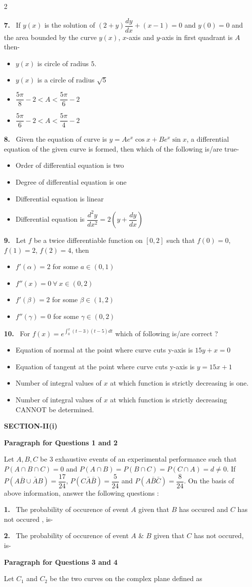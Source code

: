 \documentclass[10pt]{extarticle}
\newcommand{\sect}[1]{\par\smallskip\noindent\textbf{#1}\par}
\newcommand{\qn}[1]{\par\smallskip\noindent\textbf{#1.}~}
\newcommand{\paraq}[2]{\par\smallskip\noindent\textbf{Paragraph for Questions #1 and #2}\par}
\newenvironment{qoptions}{\begin{itemize}[leftmargin=1.8em,itemsep=1pt,topsep=2pt,label={}]}{\end{itemize}}
\newcommand{\opt}[2]{\item[(#1)] #2}
\begin{document}
\begin{multicols}{2}
\begin{qoptions}
\end{qoptions}
\qn{7} If $y(x)$ is the solution of $(2+y)\dfrac{dy}{dx}+(x-1)=0$ and $y(0)=0$ and the area bounded by the curve $y(x)$, $x$-axis and $y$-axis in first quadrant is $A$ then-
\begin{qoptions}
\opt{A}{$y(x)$ is circle of radius $5$.}
\opt{B}{$y(x)$ is a circle of radius $\sqrt5$}
\opt{C}{$\dfrac{5\pi}8-2<A<\dfrac{5\pi}{6}-2$}
\opt{D}{$\dfrac{5\pi}6-2<A<\dfrac{5\pi}{4}-2$}
\end{qoptions}
\qn{8} Given the equation of curve is $y=Ae^x\cos x+Be^x\sin x$, a differential equation of the given curve is formed, then which of the following is/are true-
\begin{qoptions}
\opt{A}{Order of differential equation is two}
\opt{B}{Degree of differential equation is one}
\opt{C}{Differential equation is linear}
\opt{D}{Differential equation is $\dfrac{d^2y}{dx^2}=2\left(y+\dfrac{dy}{dx}\right)$}
\end{qoptions}
\qn{9} Let $f$ be a twice differentiable function on $[0,2]$ such that $f(0)=0$, $f(1)=2$, $f(2)=4$, then
\begin{qoptions}
\opt{A}{$f'(\alpha)=2$ for some $a\in(0,1)$}
\opt{B}{$f''(x)=0\ \forall\ x\in(0,2)$}
\opt{C}{$f'(\beta)=2$ for some $\beta\in(1,2)$}
\opt{D}{$f''(\gamma)=0$ for some $\gamma\in(0,2)$}
\end{qoptions}
\qn{10} For $f(x)=e^{\int_0^x(t-3)(t-5)dt}$ which of following is/are correct ?
\begin{qoptions}
\opt{A}{Equation of normal at the point where curve cuts y-axis is $15y+x=0$}
\opt{B}{Equation of tangent at the point where curve cuts y-axis is $y=15x+1$}
\opt{C}{Number of integral values of $x$ at which function is strictly decreasing is one.}
\opt{D}{Number of integral values of $x$ at which function is strictly decreasing CANNOT be determined.}
\end{qoptions}
\sect{SECTION-II(i)}
\paraq{1}{2}
Let $A,B,C$ be $3$ exhaustive events of an experimental performance such that $P(A\cap B\cap C)=0$ and $P(A\cap B)=P(B\cap C)=P(C\cap A)=d\neq0$. If $P\left(A\bar B\cup\bar AB\right)=\dfrac{17}{24}$, $P\left(C\bar A\bar B\right)=\dfrac5{24}$ and $P\left(A\bar B\bar C\right)=\dfrac8{24}$. On the basis of above information, answer the following questions :
\qn{1} The probability of occurence of event $A$ given that $B$ has occured and $C$ has not occured , is-
\qn{2} The probability of occurence of event $A$ \& $B$ given that $C$ has not occured, is-
\paraq{3}{4}
Let $C_1$ and $C_2$ be the two curves on the complex plane defined as\par

\end{multicols}
\end{document}
